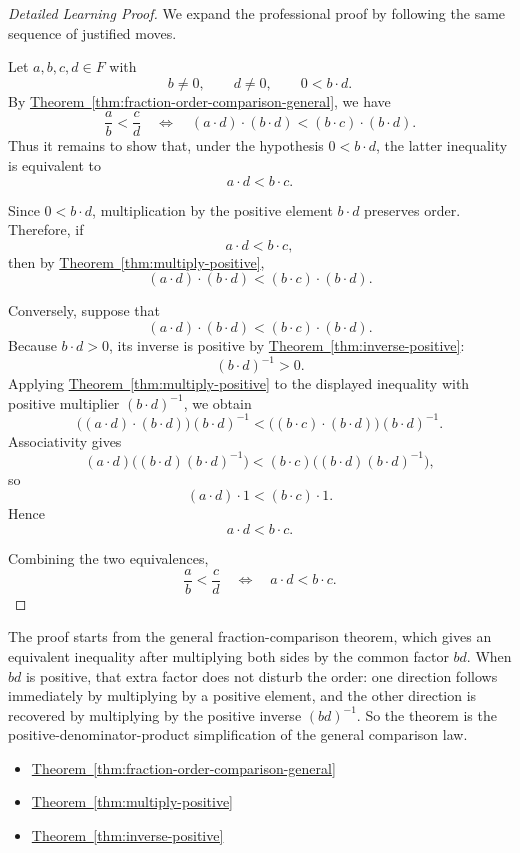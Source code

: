 \begin{proof}[Detailed Learning Proof]
\LRAProofBodyStart
We expand the professional proof by following the same sequence of justified moves.

Let $a,b,c,d\in F$ with
\[
b\neq 0,\qquad d\neq 0,\qquad 0<b\cdot d.
\]
By
\hyperref[thm:fraction-order-comparison-general]{Theorem~\ref*{thm:fraction-order-comparison-general}},
we have
\[
\frac{a}{b}<\frac{c}{d}
\quad\Longleftrightarrow\quad
(a\cdot d)\cdot(b\cdot d)<(b\cdot c)\cdot(b\cdot d).
\]
Thus it remains to show that, under the hypothesis $0<b\cdot d$, the latter
inequality is equivalent to
\[
a\cdot d<b\cdot c.
\]

Since $0<b\cdot d$, multiplication by the positive element $b\cdot d$
preserves order.  Therefore, if
\[
a\cdot d<b\cdot c,
\]
then by
\hyperref[thm:multiply-positive]{Theorem~\ref*{thm:multiply-positive}},
\[
(a\cdot d)\cdot(b\cdot d)<(b\cdot c)\cdot(b\cdot d).
\]

Conversely, suppose that
\[
(a\cdot d)\cdot(b\cdot d)<(b\cdot c)\cdot(b\cdot d).
\]
Because $b\cdot d>0$, its inverse is positive by
\hyperref[thm:inverse-positive]{Theorem~\ref*{thm:inverse-positive}}:
\[
(b\cdot d)^{-1}>0.
\]
Applying
\hyperref[thm:multiply-positive]{Theorem~\ref*{thm:multiply-positive}}
to the displayed inequality with positive multiplier $(b\cdot d)^{-1}$, we
obtain
\[
\bigl((a\cdot d)\cdot(b\cdot d)\bigr)(b\cdot d)^{-1}
<
\bigl((b\cdot c)\cdot(b\cdot d)\bigr)(b\cdot d)^{-1}.
\]
Associativity gives
\[
(a\cdot d)\bigl((b\cdot d)(b\cdot d)^{-1}\bigr)
<
(b\cdot c)\bigl((b\cdot d)(b\cdot d)^{-1}\bigr),
\]
so
\[
(a\cdot d)\cdot 1<(b\cdot c)\cdot 1.
\]
Hence
\[
a\cdot d<b\cdot c.
\]

Combining the two equivalences,
\[
\frac{a}{b}<\frac{c}{d}
\quad\Longleftrightarrow\quad
a\cdot d<b\cdot c.
\]
\end{proof}

\begin{remark*}
The proof starts from the general fraction-comparison theorem, which gives an
equivalent inequality after multiplying both sides by the common factor $bd$.
When $bd$ is positive, that extra factor does not disturb the order: one
direction follows immediately by multiplying by a positive element, and the
other direction is recovered by multiplying by the positive inverse
$(bd)^{-1}$.  So the theorem is the positive-denominator-product simplification
of the general comparison law.
\end{remark*}

\begin{dependencies}
\begin{itemize}
  \item \hyperref[thm:fraction-order-comparison-general]{Theorem~\ref*{thm:fraction-order-comparison-general}}
  \item \hyperref[thm:multiply-positive]{Theorem~\ref*{thm:multiply-positive}}
  \item \hyperref[thm:inverse-positive]{Theorem~\ref*{thm:inverse-positive}}
\end{itemize}
\end{dependencies}

\clearpage
